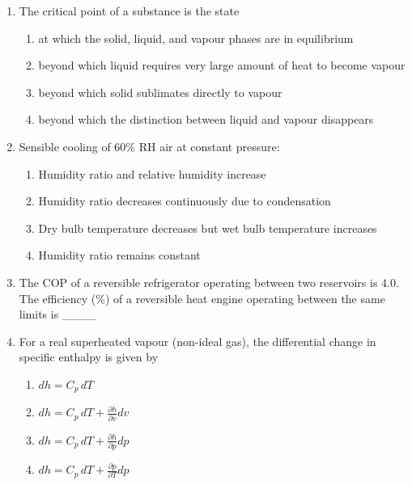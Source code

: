 \documentclass[journal,12pt,onecolumn]{IEEEtran}
\begin{document}
\begin{enumerate}[label=\arabic*)]
\item The critical point of a substance is the state  
\hfill{} \\

\vspace{0.2cm}
\begin{enumerate}[label=\alph*)]
\item at which the solid, liquid, and vapour phases are in equilibrium
\item beyond which liquid requires very large amount of heat to become vapour
\item beyond which solid sublimates directly to vapour
\item beyond which the distinction between liquid and vapour disappears
\end{enumerate}
\vspace{0.5cm}

\item Sensible cooling of $60\%$ RH air at constant pressure:  
\hfill{} \\

\vspace{0.2cm}
\begin{enumerate}[label=\alph*)]
\item Humidity ratio and relative humidity increase
\item Humidity ratio decreases continuously due to condensation
\item Dry bulb temperature decreases but wet bulb temperature increases
\item Humidity ratio remains constant
\end{enumerate}
\vspace{0.5cm}

\item The COP of a reversible refrigerator operating between two reservoirs is $4.0$. The efficiency (\%) of a reversible heat engine operating between the same limits is \_\_\_\_
\hfill{} \\

\newpage

\item For a real superheated vapour (non-ideal gas), the differential change in specific enthalpy is given by  
\hfill{} \\

\vspace{0.2cm}
\begin{enumerate}[label=\alph*)]
\item $dh = C_p\,dT$
\item $dh = C_p\,dT + \frac{\partial h}{\partial v} dv$
\item $dh = C_p\,dT + \frac{\partial h}{\partial p} dp$
\item $dh = C_p\,dT + \frac{\partial p}{\partial T} dp$
\end{enumerate}
\vspace{0.5cm}


\end{enumerate}
\end{document}
